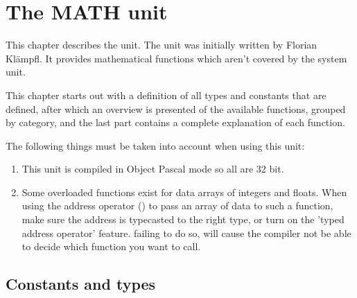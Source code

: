 %
%
%
%
%
\chapter{The MATH unit}

This chapter describes the  unit. The  unit
was initially written by Florian Kl\"ampfl. It provides mathematical
functions which aren't covered by the system unit.

This chapter starts out with a definition of all types and constants
that are defined, after which an overview is presented of the available 
functions, grouped by category, and the last part contains a 
complete explanation of each function.

The following things must be taken into account when using this unit:
\begin{enumerate}
\item This unit is compiled in Object Pascal mode so all
 are 32 bit.
\item Some overloaded functions exist for data arrays of integers and
floats. When using the address operator () to pass an array of 
data to such a function, make sure the address is typecasted to the 
right type, or turn on the 'typed address operator' feature. failing to
do so, will cause the compiler not be able to decide which function you 
want to call.
\end{enumerate}

\section{Constants and types}

